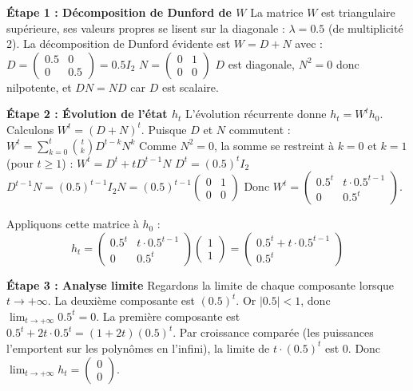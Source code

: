 \documentclass[11pt,a4paper]{article}
\begin{document}
\textbf{Étape 1 : Décomposition de Dunford de $W$}
La matrice $W$ est triangulaire supérieure, ses valeurs propres se lisent sur la diagonale : $\lambda = 0.5$ (de multiplicité 2).
La décomposition de Dunford évidente est $W = D + N$ avec :
$D = \begin{pmatrix} 0.5 & 0 \\ 0 & 0.5 \end{pmatrix} = 0.5 I_2$
$N = \begin{pmatrix} 0 & 1 \\ 0 & 0 \end{pmatrix}$
$D$ est diagonale, $N^2 = 0$ donc nilpotente, et $DN = ND$ car $D$ est scalaire.

\textbf{Étape 2 : Évolution de l'état $h_t$}
L'évolution récurrente donne $h_t = W^t h_0$.
Calculons $W^t = (D + N)^t$. Puisque $D$ et $N$ commutent :
$W^t = \sum_{k=0}^{t} \binom{t}{k} D^{t-k} N^k$
Comme $N^2 = 0$, la somme se restreint à $k=0$ et $k=1$ (pour $t \geq 1$) :
$W^t = D^t + t D^{t-1} N$
$D^t = (0.5)^t I_2$
$D^{t-1} N = (0.5)^{t-1} I_2 N = (0.5)^{t-1} \begin{pmatrix} 0 & 1 \\ 0 & 0 \end{pmatrix}$
Donc $W^t = \begin{pmatrix} 0.5^t & t \cdot 0.5^{t-1} \\ 0 & 0.5^t \end{pmatrix}$.

Appliquons cette matrice à $h_0$ :
$$ h_t = \begin{pmatrix} 0.5^t & t \cdot 0.5^{t-1} \\ 0 & 0.5^t \end{pmatrix} \begin{pmatrix} 1 \\ 1 \end{pmatrix} = \begin{pmatrix} 0.5^t + t \cdot 0.5^{t-1} \\ 0.5^t \end{pmatrix} $$

\textbf{Étape 3 : Analyse limite}
Regardons la limite de chaque composante lorsque $t \to +\infty$.
La deuxième composante est $(0.5)^t$. Or $|0.5| < 1$, donc $\lim_{t \to +\infty} 0.5^t = 0$.
La première composante est $0.5^t + 2t \cdot 0.5^t = (1+2t)(0.5)^t$.
Par croissance comparée (les puissances l'emportent sur les polynômes en l'infini), la limite de $t \cdot (0.5)^t$ est $0$.
Donc $\lim_{t \to +\infty} h_t = \begin{pmatrix} 0 \\ 0 \end{pmatrix}$.
\end{document}
